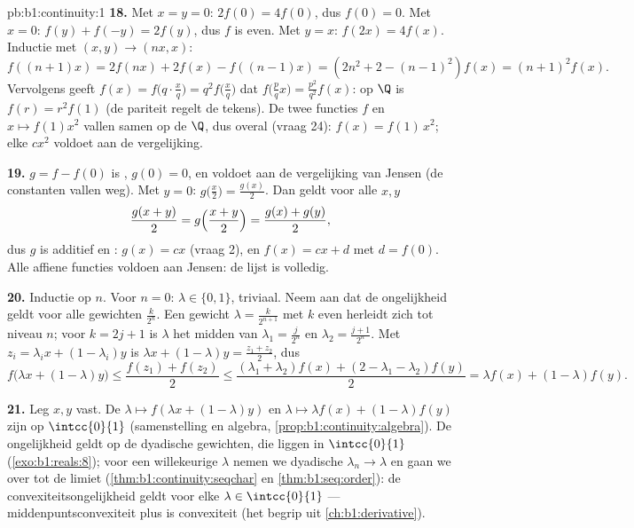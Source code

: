 \begin{solution}{pb:b1:continuity:1}
\textbf{18.} Met $x = y = 0$: $2f(0) = 4f(0)$, dus $f(0) = 0$. Met
$x = 0$: $f(y) + f(-y) = 2f(y)$, dus $f$ is even. Met $y = x$:
$f(2x) = 4f(x)$. Inductie met $(x, y) \to (nx, x)$:
\[
f((n{+}1)x) = 2f(nx) + 2f(x) - f((n{-}1)x)
= (2n^2 + 2 - (n-1)^2) f(x) = (n+1)^2 f(x) .
\]
Vervolgens geeft $f(x) = f\bigl(q\cdot\frac xq\bigr) = q^2
f\bigl(\frac xq\bigr)$ dat $f\bigl(\frac pq x\bigr) =
\frac{p^2}{q^2}f(x)$: op $\Q$ is $f(r) = r^2 f(1)$ (de pariteit
regelt de tekens). De twee  functies $f$ en $x \mapsto
f(1)x^2$ vallen samen op de   $\Q$, dus overal
(vraag 24): $f(x) = f(1)\,x^2$; elke $cx^2$ voldoet aan de
vergelijking.

\textbf{19.} $g = f - f(0)$ is , $g(0) = 0$, en voldoet aan
de vergelijking van Jensen (de constanten vallen weg). Met $y = 0$:
$g\bigl(\frac x2\bigr) = \frac{g(x)}{2}$. Dan geldt voor alle $x, y$
\[
\frac{g(x + y)}{2} = g\Bigl(\frac{x+y}{2}\Bigr)
= \frac{g(x) + g(y)}{2} ,
\]
dus $g$ is additief en : $g(x) = cx$ (vraag 2), en $f(x) = cx
+ d$ met $d = f(0)$. Alle affiene functies voldoen aan Jensen: de
lijst is volledig.

\textbf{20.} Inductie op $n$. Voor $n = 0$: $\lambda \in \{0, 1\}$,
triviaal. Neem aan dat de ongelijkheid geldt voor alle gewichten
$\frac{k}{2^n}$. Een gewicht $\lambda = \frac{k}{2^{n+1}}$ met $k$
even herleidt zich tot niveau $n$; voor $k = 2j + 1$ is $\lambda$
het midden van $\lambda_1 = \frac{j}{2^n}$ en $\lambda_2 =
\frac{j+1}{2^n}$. Met $z_i = \lambda_i x + (1 - \lambda_i)y$ is
$\lambda x + (1-\lambda)y = \frac{z_1 + z_2}{2}$, dus
\[
f\bigl(\lambda x + (1{-}\lambda)y\bigr)
\leq \frac{f(z_1) + f(z_2)}{2}
\leq \frac{(\lambda_1 + \lambda_2)f(x) + (2 - \lambda_1 -
\lambda_2)f(y)}{2}
= \lambda f(x) + (1 - \lambda)f(y) .
\]

\textbf{21.} Leg $x, y$ vast. De  $\lambda \mapsto
f(\lambda x + (1 - \lambda)y)$ en $\lambda \mapsto \lambda f(x) + (1
- \lambda)f(y)$ zijn  op $\intcc{0}{1}$ (samenstelling en
algebra, \cref{prop:b1:continuity:algebra}). De ongelijkheid geldt
op de dyadische gewichten, die  liggen in $\intcc{0}{1}$
(\cref{exo:b1:reals:8}); voor een willekeurige $\lambda$ nemen we
dyadische $\lambda_n \to \lambda$ en gaan we over tot de limiet
(\cref{thm:b1:continuity:seqchar} en \cref{thm:b1:seq:order}): de
convexiteitsongelijkheid geldt voor elke $\lambda \in
\intcc{0}{1}$ --- middenpuntsconvexiteit plus  is
convexiteit (het begrip uit \cref{ch:b1:derivative}).


\end{solution}
